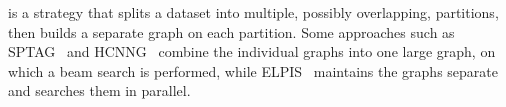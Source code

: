 \begin{comment}
\noindent{\bf{Neighborhood diversification (ND)}} is a process that aims at diversifying \karima{\bf explain what is meant by diversify} the list of candidate neighbors for a node during the index building phase\ilias{to contains not only the closest neighbors to the node, but may include few fatherest nodes that improve the navigability through the graph during search}. This is achieved by eliminating triangular connections within the graph, which results in a node's neighborhood list potentially including more distant neighbors that do not form triangular connections with the node. ND-based graph methods leverage ND strategies such as relative neighborhood diversification, based on the Relative Neighborhood Graph (RNG)~\cite{rng}, or its approximations, to select neighbors for each node from its top \( k \)  candidate approximate nearest neighbors. The concept of 'relatively close' neighbors, foundational to RNG, was introduced by Lankford in 1969~\cite{lankford69}. According to this principle, two vertices \( (V_i, V_j) \) from the set \( {V}^2 \) are considered relatively close if and only if 
$
\text{dist}(V_i,V_j) \leq \max[\text{dist}(V_i,V_w),\text{dist}(V_w,V_j)] \quad \text{for all} \quad w = 1,...,n, w\neq i,j.$
This idea has been effectively utilized in recent approximate graph-based similarity search algorithms as a heuristic to refine edges. The aim is to minimize the required number of comparisons and distance calculations to reach the query's nearest neighbor (NN) region during beam search, enhancing the search's efficiency and accuracy.
\end{comment}

 is a strategy that splits a dataset into multiple, possibly overlapping, partitions, then builds a separate graph on each partition. 
Some approaches such as SPTAG~\cite{SPTAG4} and HCNNG~\cite{hcnng} combine the individual graphs into one large graph, on which a beam search is performed, while ELPIS~\cite{elpis} maintains the graphs separate and searches them in parallel.

